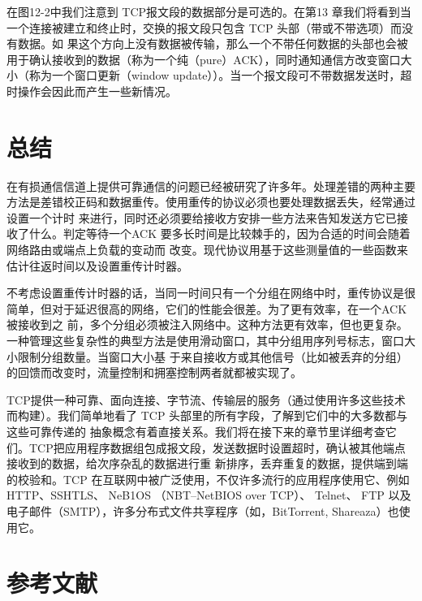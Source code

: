 在图12-2中我们注意到 TCP报文段的数据部分是可选的。在第13 章我们将看到当一个连接被建立和终止时，交换的报文段只包含 TCP 头部（带或不带选项）而没有数据。如
果这个方向上没有数据被传输，那么一个不带任何数据的头部也会被用于确认接收到的数据（称为一个纯（pure）ACK），同时通知通信方改变窗口大小（称为一个窗口更新（window
update））。当一个报文段可不带数据发送时，超时操作会因此而产生一些新情况。
\section{总结}
在有损通信信道上提供可靠通信的问题已经被研究了许多年。处理差错的两种主要方法是差错校正码和数据重传。使用重传的协议必须也要处理数据丢失，经常通过设置一个计时
来进行，同时还必须要给接收方安排一些方法来告知发送方它已接收了什么。判定等待一个ACK 要多长时间是比较棘手的，因为合适的时间会随着网络路由或端点上负载的变动而
改变。现代协议用基于这些测量值的一些函数来估计往返时间以及设置重传计时器。

不考虑设置重传计时器的话，当同一时间只有一个分组在网络中时，重传协议是很简单，但对于延迟很高的网络，它们的性能会很差。为了更有效率，在一个ACK 被接收到之
前，多个分组必须被注入网络中。这种方法更有效率，但也更复杂。一种管理这些复杂性的典型方法是使用滑动窗口，其中分组用序列号标志，窗口大小限制分组数量。当窗口大小基
于来自接收方或其他信号（比如被丢弃的分组）的回馈而改变时，流量控制和拥塞控制两者就都被实现了。

TCP提供一种可靠、面向连接、字节流、传输层的服务（通过使用许多这些技术而构建）。我们简单地看了 TCP 头部里的所有字段，了解到它们中的大多数都与这些可靠传递的
抽象概念有着直接关系。我们将在接下来的章节里详细考查它们。TCP把应用程序数据组包成报文段，发送数据时设置超时，确认被其他端点接收到的数据，给次序杂乱的数据进行重
新排序，丢弃重复的数据，提供端到端的校验和。TCP 在互联网中被广泛使用，不仅许多流行的应用程序使用它、例如 HTTP、SSHTLS、 NeB1OS （NBT--NetBIOS over TCP）、
Telnet、 FTP 以及电子邮件（SMTP），许多分布式文件共享程序（如，BitTorrent, Shareaza）也使用它。
\section{参考文献}
